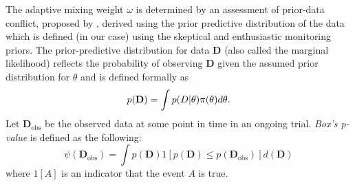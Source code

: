 \documentclass[AMA,STIX1COL,doublespace]{WileyNJD-v2}
\begin{document}
The adaptive mixing weight $\omega$ is determined by an assessment of prior-data conflict, proposed by \cite{Box1980}, derived using the prior predictive distribution of 
the data which is defined (in our case) using the skeptical and enthusiastic monitoring priors.
The prior-predictive distribution for data $\mathbf{D}$ (also called the marginal likelihood) reflects the probability of observing $\mathbf{D}$ given 
the assumed prior distribution for $\theta$ and is defined formally as
\begin{equation}\label{eq:pred_dist}
p(\mathbf{D}) =\int p(\boldmath{D}|\theta)\pi(\theta)d\theta.
\end{equation}
Let $\mathbf{D}_{\text{obs}}$ be the observed data at some point in time in an ongoing trial. 
\textit{Box's p-value} is defined as the following:
\begin{equation}\label{eq:box_p}
\psi({\mathbf{D}_{\text{obs}}})=\int {p(\mathbf{D})}  1[p(\mathbf{D})\leq p(\mathbf{D}_{\text{obs}})] d(\mathbf{D})
\end{equation}
%
where $1[A]$ is an indicator that the event $A$ is true.
\end{document}
